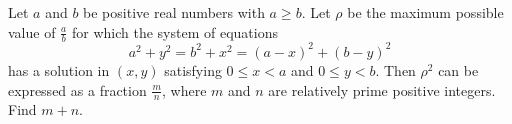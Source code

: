 Let $ a$ and $ b$ be positive real numbers with $ a\ge b$. Let $ \rho$ be the maximum possible value of $ \frac{a}{b}$ for which the system of equations
\[ a^2+y^2=b^2+x^2=(a-x)^2+(b-y)^2\]has a solution in $ (x,y)$ satisfying $ 0\le x<a$ and $ 0\le y<b$. Then $ \rho^2$ can be expressed as a fraction $ \frac{m}{n}$, where $ m$ and $ n$ are relatively prime positive integers. Find $ m+n$.
